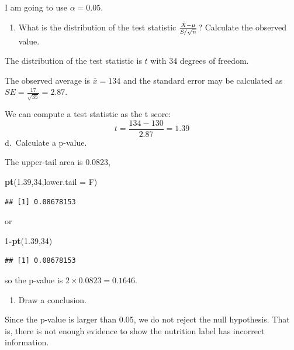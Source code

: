 \documentclass[
]{book}
\newenvironment{Shaded}{\begin{snugshade}}{\end{snugshade}}
\newcommand{\DataTypeTok}[1]{\textcolor[rgb]{0.13,0.29,0.53}{#1}}
\newcommand{\DecValTok}[1]{\textcolor[rgb]{0.00,0.00,0.81}{#1}}
\newcommand{\FloatTok}[1]{\textcolor[rgb]{0.00,0.00,0.81}{#1}}
\newcommand{\KeywordTok}[1]{\textcolor[rgb]{0.13,0.29,0.53}{\textbf{#1}}}
\newcommand{\NormalTok}[1]{#1}
\newcommand{\OperatorTok}[1]{\textcolor[rgb]{0.81,0.36,0.00}{\textbf{#1}}}
\providecommand{\tightlist}{%
  \setlength{\itemsep}{0pt}\setlength{\parskip}{0pt}}
\begin{document}
I am going to use \(\alpha = 0.05\).

\begin{enumerate}
\def\labelenumi{\alph{enumi}.}
\setcounter{enumi}{2}
\tightlist
\item
  What is the distribution of the test statistic \({\bar{X}-\mu\over S/\sqrt{n}}\)? Calculate the observed value.
\end{enumerate}

The distribution of the test statistic is \(t\) with 34 degrees of freedom.

The observed average is \(\bar{x} = 134\) and the standard error may be calculated as \(SE = \frac{17}{\sqrt{35}} = 2.87\).

We can compute a test statistic as the t score:
\[
t = \frac{134 - 130}{2.87} = 1.39
\]
d.~Calculate a p-value.

The upper-tail area is 0.0823,

\begin{Shaded}
\begin{Highlighting}[]
\KeywordTok{pt}\NormalTok{(}\FloatTok{1.39}\NormalTok{,}\DecValTok{34}\NormalTok{,}\DataTypeTok{lower.tail =}\NormalTok{ F)}
\end{Highlighting}
\end{Shaded}

\begin{verbatim}
## [1] 0.08678153
\end{verbatim}

or

\begin{Shaded}
\begin{Highlighting}[]
\DecValTok{1}\OperatorTok{-}\KeywordTok{pt}\NormalTok{(}\FloatTok{1.39}\NormalTok{,}\DecValTok{34}\NormalTok{)}
\end{Highlighting}
\end{Shaded}

\begin{verbatim}
## [1] 0.08678153
\end{verbatim}

so the p-value is \(2 \times 0.0823 = 0.1646\).

\begin{enumerate}
\def\labelenumi{\alph{enumi}.}
\setcounter{enumi}{4}
\tightlist
\item
  Draw a conclusion.
\end{enumerate}

Since the p-value is larger than 0.05, we do not reject the null hypothesis. That is, there is not enough evidence to show the nutrition label has incorrect information.
\end{document}
